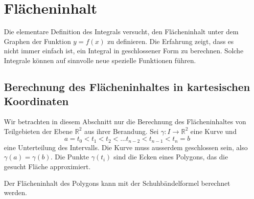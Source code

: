%
%
%
\section{Flächeninhalt
\label{buch:geometrie:section:flaeche}}
Die elementare Definition des Integrals versucht, den Flächeninhalt
unter dem Graphen der Funktion $y=f(x)$ zu definieren.
Die Erfahrung zeigt, dass es nicht immer einfach ist, ein Integral in
geschlossener Form zu berechnen.
Solche Integrale können auf sinnvolle neue spezielle Funktionen führen.

%
%
\subsection{Berechnung des Flächeninhaltes in kartesischen Koordinaten}
Wir betrachten in diesem Abschnitt nur die Berechnung des
Flächeninhaltes von Teilgebieten der Ebene $\mathbb{R}^2$
aus ihrer Berandung.
Sei $\gamma\colon I \to\mathbb{R}^2$ eine Kurve und 
\[
a=t_0<t_1<t_2<\dots t_{n-2}<t_{n-1}<t_n=b
\]
eine Unterteilung des Intervalls.
Die Kurve muss ausserdem geschlossen sein, also $\gamma(a)=\gamma(b)$.
Die Punkte $\gamma(t_i)$ sind die Ecken eines Polygons, das die gesucht
Fläche approximiert.

Der Flächeninhalt des Polygons kann mit der Schuhbändelformel
\cite[p.~184]{buch:linalg}
berechnet werden.

